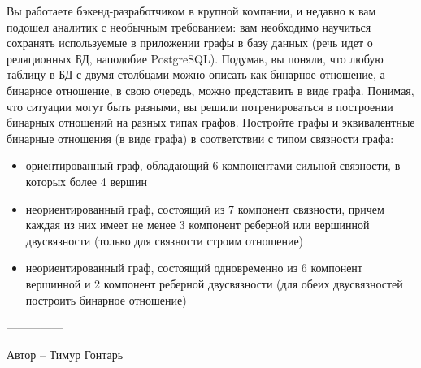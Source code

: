 \question
Вы работаете бэкенд-разработчиком в крупной компании, и недавно к вам подошел аналитик с необычным требованием: вам необходимо научиться сохранять используемые в приложении графы в базу данных (речь идет о реляционных БД, наподобие PostgreSQL). Подумав, вы поняли, что любую таблицу в БД с двумя столбцами можно описать как бинарное отношение, а бинарное отношение, в свою очередь, можно представить в виде графа. Понимая, что ситуации могут быть разными, вы решили потренироваться в построении бинарных отношений на разных типах графов. Постройте графы и эквивалентные бинарные отношения (в виде графа) в соответствии с типом связности графа:

\begin{itemize}
\item ориентированный граф, обладающий 6 компонентами сильной связности, в которых более 4 вершин
\item неориентированный граф, состоящий из 7 компонент связности, причем каждая из них имеет не менее 3 компонент реберной или вершинной двусвязности (только для связности строим отношение)
\item неориентированный граф, состоящий одновременно из 6 компонент вершинной и 2 компонент реберной двусвязности (для обеих двусвязностей построить бинарное отношение)
\end{itemize}

---------------

Автор -- Тимур Гонтарь